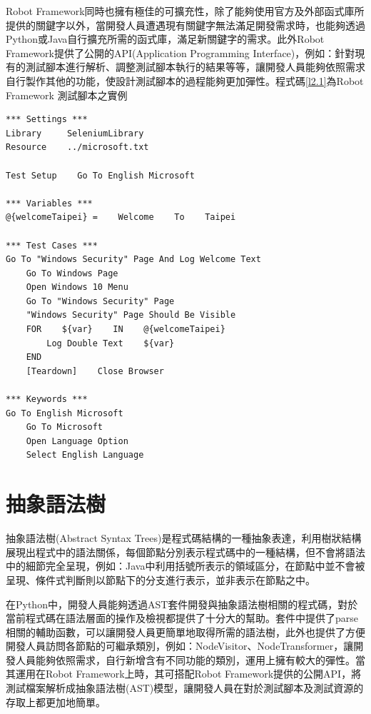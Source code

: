 \indent
Robot Framework同時也擁有極佳的可擴充性，除了能夠使用官方及外部函式庫所提供的關鍵字以外，當開發人員遭遇現有關鍵字無法滿足開發需求時，也能夠透過Python或Java自行擴充所需的函式庫，滿足新關鍵字的需求。此外Robot Framework提供了公開的API(Application Programming Interface)\cite{RobotFrameworkAPI}，例如：針對現有的測試腳本進行解析、調整測試腳本執行的結果等等，讓開發人員能夠依照需求自行製作其他的功能，使設計測試腳本的過程能夠更加彈性。程式碼\ref{l2.1}為Robot Framework 測試腳本之實例

\begin{lstlisting}[caption=Robot Framework 實例腳本, label={l2.1}]
*** Settings ***
Library     SeleniumLibrary
Resource    ../microsoft.txt

Test Setup    Go To English Microsoft

*** Variables ***
@{welcomeTaipei} =    Welcome    To    Taipei

*** Test Cases ***
Go To "Windows Security" Page And Log Welcome Text
    Go To Windows Page
    Open Windows 10 Menu
    Go To "Windows Security" Page
    "Windows Security" Page Should Be Visible
    FOR    ${var}    IN    @{welcomeTaipei}
        Log Double Text    ${var}
    END
    [Teardown]    Close Browser
    
*** Keywords ***
Go To English Microsoft 
    Go To Microsoft
    Open Language Option
    Select English Language
\end{lstlisting}

\section{抽象語法樹}\label{s2.3}
\indent
抽象語法樹(Abstract Syntax Trees)\cite{AST}是程式碼結構的一種抽象表達，利用樹狀結構展現出程式中的語法關係，每個節點分別表示程式碼中的一種結構，但不會將語法中的細節完全呈現，例如：Java中利用括號所表示的領域區分，在節點中並不會被呈現、條件式判斷則以節點下的分支進行表示，並非表示在節點之中。

\indent
在Python中，開發人員能夠透過AST套件\cite{ASTmodule}開發與抽象語法樹相關的程式碼，對於當前程式碼在語法層面的操作及檢視都提供了十分大的幫助。套件中提供了parse相關的輔助函數，可以讓開發人員更簡單地取得所需的語法樹，此外也提供了方便開發人員訪問各節點的可繼承類別，例如：NodeVisitor、NodeTransformer，讓開發人員能夠依照需求，自行新增含有不同功能的類別，運用上擁有較大的彈性。當其運用在Robot Framework上時，其可搭配Robot Framework提供的公開API，將測試檔案解析成抽象語法樹(AST)模型，讓開發人員在對於測試腳本及測試資源的存取上都更加地簡單。



